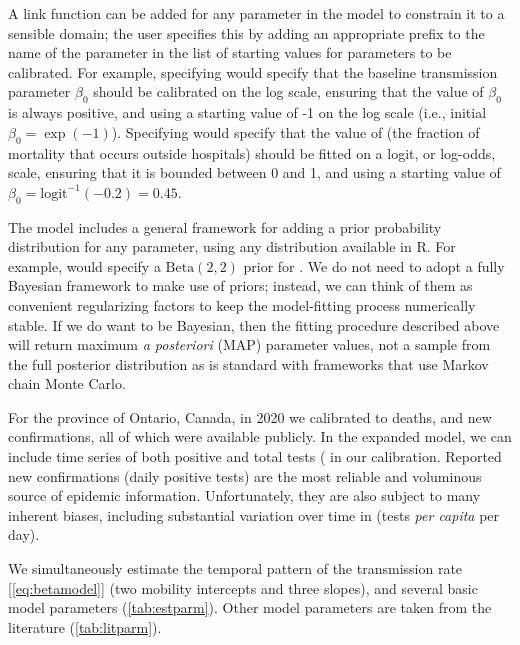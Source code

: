 \documentclass[12pt]{article}\usepackage[]{graphicx}\usepackage[]{color}
\begin{document}
A link function can be added for any parameter in the model to constrain it to a sensible domain; the user specifies this by adding an appropriate prefix to the name of the parameter in the list of starting values for parameters to be calibrated. 
For example, specifying  would specify that the baseline transmission parameter $\beta_0$ should be calibrated on the log scale, ensuring that the value of $\beta_0$ is always positive, and using a starting value of -1 on the log scale (i.e., initial $\beta_0 = \exp(-1)$). 
Specifying  would specify that the value of  (the fraction of mortality that occurs outside hospitals) should be fitted on a logit, or log-odds, scale, ensuring that it is bounded between 0 and 1, and using a starting value of $\beta_0 = \textrm{logit}^{-1}(-0.2) = 0.45$.

The model includes a general framework for adding a prior probability distribution for any parameter, using any distribution available in R. 
For example,  would specify a $\textrm{Beta}(2,2)$ prior for .
We do not need to adopt a fully Bayesian framework to make use of priors; instead, we can think of them as convenient regularizing factors to keep the model-fitting process numerically stable. If we do want to be Bayesian, then the fitting procedure described above will return maximum \emph{a posteriori} (MAP) parameter values, not a sample from the full posterior distribution as is standard with frameworks that use Markov chain Monte Carlo.

For the province of Ontario, Canada, in 2020
we calibrated to deaths, and new confirmations, all of which were available publicly. 
In the expanded model, we can include time series of both positive and total tests ( in our calibration. 
Reported new confirmations (daily positive tests) are the most reliable and voluminous source of epidemic information.
Unfortunately, they are also subject to many inherent biases, including substantial variation over time in  (\ie tests \emph{per capita} per day).

We simultaneously estimate the temporal pattern of the transmission rate [\cref{eq:betamodel}] (two mobility intercepts and three slopes), and several basic model parameters (\cref{tab:estparm}).
Other model parameters are taken from the literature (\cref{tab:litparm}).
\end{document}
